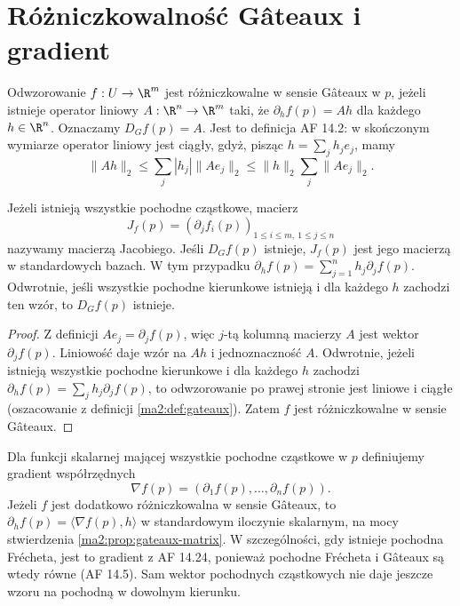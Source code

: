 \section{Różniczkowalność Gâteaux i gradient}

\begin{definicja}
\label{ma2:def:gateaux}
Odwzorowanie $f:U\to\R^m$ jest różniczkowalne
w sensie Gâteaux w $p$, jeżeli istnieje operator
liniowy $A:\R^n\to\R^m$ taki, że
$\partial_hf(p)=Ah$ dla każdego $h\in\R^n$.
Oznaczamy $D_Gf(p)=A$. Jest to definicja AF 14.2:
w skończonym wymiarze operator liniowy jest ciągły,
gdyż, pisząc $h=\sum_jh_je_j$, mamy
\[
 \|Ah\|_2\le \sum_j|h_j|\|Ae_j\|_2
 \le \|h\|_2\sum_j\|Ae_j\|_2.
\]
\end{definicja}

\begin{stwierdzenie}
\label{ma2:prop:gateaux-matrix}
Jeżeli istnieją wszystkie pochodne cząstkowe,
macierz
\[
 J_f(p)=(\partial_j f_i(p))_
 {1\le i\le m,\ 1\le j\le n}
\]
nazywamy macierzą Jacobiego.
Jeśli $D_Gf(p)$ istnieje, $J_f(p)$ jest jego macierzą
w standardowych bazach. W tym przypadku
$\partial_h f(p)=\sum_{j=1}^n h_j\partial_j f(p)$.
Odwrotnie, jeśli wszystkie pochodne kierunkowe istnieją
i dla każdego $h$ zachodzi ten wzór, to $D_Gf(p)$ istnieje.
\end{stwierdzenie}
\begin{proof}
Z definicji $Ae_j=\partial_j f(p)$, więc $j$-tą
kolumną macierzy $A$ jest wektor $\partial_j f(p)$.
Liniowość daje wzór na $Ah$ i jednoznaczność $A$.
Odwrotnie, jeżeli istnieją wszystkie pochodne
kierunkowe i dla każdego $h$ zachodzi
$\partial_h f(p)=\sum_j h_j\partial_j f(p)$,
to odwzorowanie po prawej stronie jest liniowe
i ciągłe (oszacowanie z definicji \ref{ma2:def:gateaux}).
Zatem $f$ jest różniczkowalne w sensie Gâteaux.
\end{proof}

Dla funkcji skalarnej mającej wszystkie pochodne
cząstkowe w $p$ definiujemy gradient współrzędnych
\[
 \nabla f(p)=(\partial_1 f(p),\ldots,\partial_n f(p)).
\]
Jeżeli $f$ jest dodatkowo różniczkowalna w sensie Gâteaux,
to $\partial_h f(p)=\langle\nabla f(p),h\rangle$
w standardowym iloczynie skalarnym, na mocy stwierdzenia
\ref{ma2:prop:gateaux-matrix}. W szczególności, gdy istnieje
pochodna Frécheta, jest to gradient z AF 14.24,
ponieważ pochodne Frécheta i Gâteaux są wtedy równe
(AF 14.5). Sam wektor pochodnych cząstkowych nie daje
jeszcze wzoru na pochodną w dowolnym kierunku.

